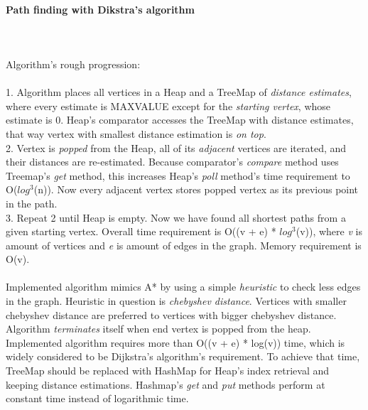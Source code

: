 \documentclass[a4paper,12pt]{article}
\begin{document}
\paragraph{\large Path finding with Dikstra's algorithm} \hspace{0pt} \\
\\
Algorithm's rough progression:\\
\\
1. Algorithm places all vertices in a Heap and a TreeMap of \emph{distance estimates}, where every estimate is MAXVALUE except for the \emph{starting vertex}, whose estimate is 0. Heap's comparator accesses the TreeMap with distance estimates, that way vertex with smallest distance estimation is \emph{on top}.\\
2. Vertex is \emph{popped} from the Heap, all of its \emph{adjacent} vertices are iterated, and their distances are re-estimated. Because comparator's \emph{compare} method uses Treemap's \emph{get} method, this increases Heap's \emph{poll} method's time requirement to O($log^{3}$(n)). Now every adjacent vertex stores popped vertex as its previous point in the path.\\
3. Repeat 2 until Heap is empty. Now we have found all shortest paths from a given starting vertex. Overall time requirement is O((v + e) * $log^{3}$(v)), where \emph{v} is amount of vertices and \emph{e} is amount of edges in the graph. Memory requirement is O(v).\\
\\
Implemented algorithm mimics A* by using a simple \emph{heuristic} to check less edges in the graph. Heuristic in question is \emph{chebyshev distance}. Vertices with smaller chebyshev distance are preferred to vertices with bigger chebyshev distance. Algorithm \emph{terminates} itself when end vertex is popped from the heap.\\
Implemented algorithm requires more than O((v + e) * log(v)) time, which is widely considered to be Dijkstra's algorithm's requirement. To achieve that time, TreeMap should be replaced with HashMap for Heap's index retrieval and keeping distance estimations. Hashmap's \emph{get} and \emph{put} methods perform at constant time instead of logarithmic time.
\end{document}
